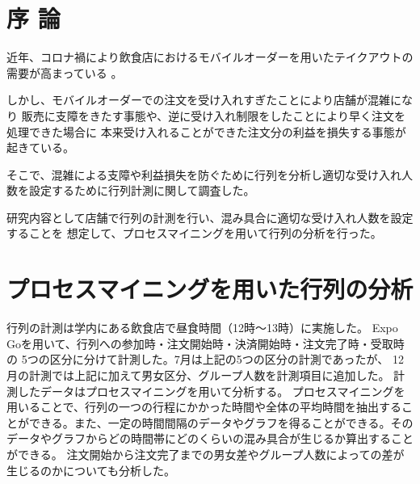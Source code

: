 \documentclass[10pt,twocolumn, a4j]{jsarticle}
\begin{document}

\renewcommand{\thesection}{\arabic{section} .}


\section{序 論}

近年、コロナ禍により飲食店におけるモバイルオーダーを用いたテイクアウトの需要が高まっている
\cite{tyousa1}。

しかし、モバイルオーダーでの注文を受け入れすぎたことにより店舗が混雑になり
販売に支障をきたす事態や、逆に受け入れ制限をしたことにより早く注文を処理できた場合に
本来受け入れることができた注文分の利益を損失する事態が起きている\cite{tyousa2}。

そこで、混雑による支障や利益損失を防ぐために行列を分析し適切な受け入れ人数を設定するために行列計測に関して調査した。

研究内容として店舗で行列の計測を行い、混み具合に適切な受け入れ人数を設定することを
想定して、プロセスマイニングを用いて行列の分析を行った。



\section{プロセスマイニングを用いた行列の分析}

行列の計測は学内にある飲食店で昼食時間（12時〜13時）に実施した。
Expo Goを用いて、行列への参加時・注文開始時・決済開始時・注文完了時・受取時の
5つの区分に分けて計測した。7月は上記の5つの区分の計測であったが、
12月の計測では上記に加えて男女区分、グループ人数を計測項目に追加した。
計測したデータはプロセスマイニングを用いて分析する。
プロセスマイニングを用いることで、行列の一つの行程にかかった時間や全体の平均時間を抽出することができる。また、一定の時間間隔のデータやグラフを得ることができる。そのデータやグラフからどの時間帯にどのくらいの混み具合が生じるか算出することができる。
注文開始から注文完了までの男女差やグループ人数によっての差が生じるのかについても分析した。
\end{document}
